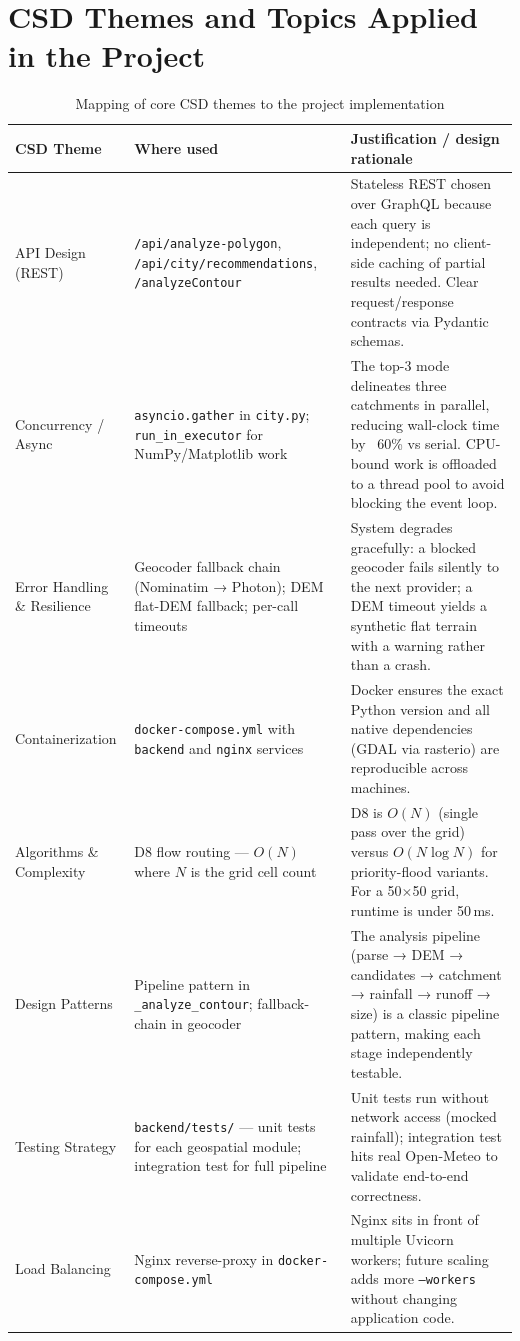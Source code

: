 \documentclass[manuscript,screen,review]{acmart}
\begin{document}
\section{CSD Themes and Topics Applied in the Project}
\label{sec:csd-themes}

\begin{table}[t]
  \caption{Mapping of core CSD themes to the project implementation}
  \label{tab:csd-themes}
  \begin{tabular}{p{2.6cm}p{4.8cm}p{6.2cm}}
    \toprule
    CSD Theme & Where used & Justification / design rationale \\
    \midrule
    API Design (REST)
      & \texttt{/api/analyze-polygon}, \texttt{/api/city/recommendations}, \texttt{/analyzeContour}
      & Stateless REST chosen over GraphQL because each query is independent; no client-side caching of partial results needed. Clear request/response contracts via Pydantic schemas. \\
    Concurrency / Async
      & \texttt{asyncio.gather} in \texttt{city.py}; \texttt{run\_in\_executor} for NumPy/Matplotlib work
      & The top-3 mode delineates three catchments in parallel, reducing wall-clock time by ~60\% vs serial. CPU-bound work is offloaded to a thread pool to avoid blocking the event loop. \\
    Error Handling \& Resilience
      & Geocoder fallback chain (Nominatim → Photon); DEM flat-DEM fallback; per-call timeouts
      & System degrades gracefully: a blocked geocoder fails silently to the next provider; a DEM timeout yields a synthetic flat terrain with a warning rather than a crash. \\
    Containerization
      & \texttt{docker-compose.yml} with \texttt{backend} and \texttt{nginx} services
      & Docker ensures the exact Python version and all native dependencies (GDAL via rasterio) are reproducible across machines. \\
    Algorithms \& Complexity
      & D8 flow routing — $O(N)$ where $N$ is the grid cell count
      & D8 is $O(N)$ (single pass over the grid) versus $O(N \log N)$ for priority-flood variants. For a 50$\times$50 grid, runtime is under 50\,ms. \\
    Design Patterns
      & Pipeline pattern in \texttt{\_analyze\_contour}; fallback-chain in geocoder
      & The analysis pipeline (parse → DEM → candidates → catchment → rainfall → runoff → size) is a classic pipeline pattern, making each stage independently testable. \\
    Testing Strategy
      & \texttt{backend/tests/} — unit tests for each geospatial module; integration test for full pipeline
      & Unit tests run without network access (mocked rainfall); integration test hits real Open-Meteo to validate end-to-end correctness. \\
    Load Balancing
      & Nginx reverse-proxy in \texttt{docker-compose.yml}
      & Nginx sits in front of multiple Uvicorn workers; future scaling adds more \texttt{--workers} without changing application code. \\
    \bottomrule
  \end{tabular}
\end{table}
\end{document}
